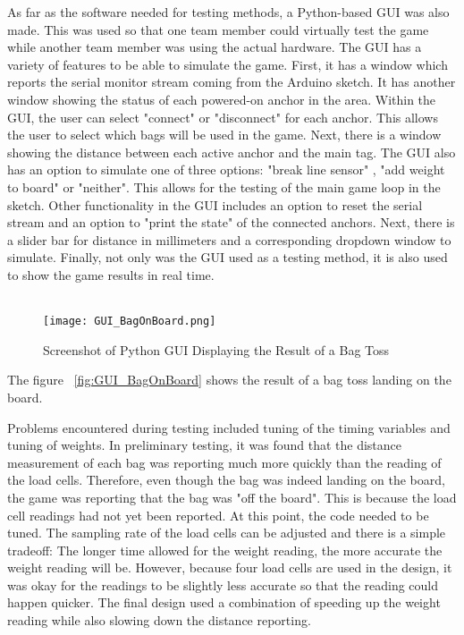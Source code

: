 \documentclass{article}
\begin{document}
As far as the software needed for testing methods, a Python-based GUI was also made. This was used so that one team member could virtually test the game while another team member was using the actual hardware. The GUI has a variety of features to be able to simulate the game. First, it has a window which reports the serial monitor stream coming from the Arduino sketch. It has another window showing the status of each powered-on anchor in the area. Within the GUI, the user can select "connect" or "disconnect" for each anchor. This allows the user to select which bags will be used in the game. Next, there is a window showing the distance between each active anchor and the main tag. The GUI also has an option to simulate one of three options: "break line sensor" , "add weight to board" or "neither". This allows for the testing of the main game loop in the sketch. Other functionality in the GUI includes an option to reset the serial stream and an option to "print the state" of the connected anchors. Next, there is a slider bar for distance in millimeters and a corresponding dropdown window to simulate. Finally, not only was the GUI used as a testing method, it is also used to show the game results in real time. 
\\ \\
\begin{figure}
    \centering
    \texttt{[image: GUI\_BagOnBoard.png]}
    \caption{Screenshot of Python GUI Displaying the Result of a Bag Toss}
    \label{fig:my_label}
\end{figure}
The figure ~\ref{fig:GUI_BagOnBoard} shows the result of a bag toss landing on the board.

Problems encountered during testing included tuning of the timing variables and tuning of weights. In preliminary testing, it was found that the distance measurement of each bag was reporting much more quickly than the reading of the load cells. Therefore, even though the bag was indeed landing on the board, the game was reporting that the bag was "off the board". This is because the load cell readings had not yet been reported. At this point, the code needed to be tuned. The sampling rate of the load cells can be adjusted and there is a simple tradeoff: The longer time allowed for the weight reading, the more accurate the weight reading will be. However, because four load cells are used in the design, it was okay for the readings to be slightly less accurate so that the reading could happen quicker. The final design used a combination of speeding up the weight reading while also slowing down the distance reporting.
\end{document}
